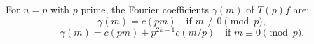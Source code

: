For $n = p$ with $p$ prime, the Fourier coefficients $\gamma(m)$ of $T(p)f$ are:
$$\gamma(m) = c(pm) \quad \text{if } m \not\equiv 0 \pmod{p},$$
$$\gamma(m) = c(pm) + p^{2k-1}c(m/p) \quad \text{if } m \equiv 0 \pmod{p}.$$
